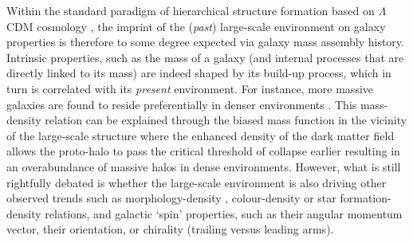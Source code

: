 \documentclass[useAMS,usenatbib]{mnras}
\begin{document}
Within the standard paradigm of hierarchical structure formation based on $\Lambda$CDM cosmology \citep{Blumenthal1984,Davis1985}, the imprint of the (\textit{past}) large-scale environment on galaxy properties is therefore to some degree expected via galaxy mass assembly history. 
Intrinsic properties, such as the mass of a galaxy (and  internal processes that are directly linked to its mass) are indeed shaped by its build-up process, which in turn is correlated with its \textit{present} environment. 
For instance, more massive galaxies are found to reside preferentially in denser environments \citep[e.g.][]{Dressler1980,PostmanGeller1984,Kauffmann2004,Baldry2006}.  
This mass-density relation can be explained through the biased mass function in the vicinity of the large-scale structure \citep[LSS;][]{Kaiser1984,Efstathiou1988} where   the enhanced density of the dark matter field  allows  the proto-halo to pass the critical threshold of collapse earlier \citep{Bond1991} resulting in an overabundance of massive halos in dense environments. 
However, what is still rightfully debated is whether the large-scale environment is also driving other observed trends such as morphology-density \citep[e.g.][]{Dressler1980,PostmanGeller1984,Dressler1997,Goto2003}, colour-density \citep[e.g.][]{Blanton2003,Baldry2006,Bamford2009} or star formation-density \citep[e.g.][]{Hashimoto1998,Lewis2002,Kauffmann2004} relations, and galactic `spin' properties, such as their angular momentum vector, their orientation, or chirality (trailing versus leading arms).
\end{document}
